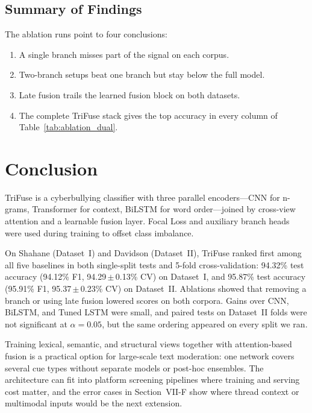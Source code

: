 \subsection{Summary of Findings}

The ablation runs point to four conclusions:
\begin{enumerate}
\item A single branch misses part of the signal on each corpus.
\item Two-branch setups beat one branch but stay below the full model.
\item Late fusion trails the learned fusion block on both datasets.
\item The complete TriFuse stack gives the top accuracy in every column of Table~\ref{tab:ablation_dual}.
\end{enumerate}

\section{Conclusion}

TriFuse is a cyberbullying classifier with three parallel encoders---CNN for n-grams, Transformer for context, BiLSTM for word order---joined by cross-view attention and a learnable fusion layer. Focal Loss and auxiliary branch heads were used during training to offset class imbalance.

On Shahane (Dataset~I) and Davidson (Dataset~II), TriFuse ranked first among all five baselines in both single-split tests and 5-fold cross-validation: 94.32\% test accuracy (94.12\% F1, 94.29\,$\pm$\,0.13\% CV) on Dataset~I, and 95.87\% test accuracy (95.91\% F1, 95.37\,$\pm$\,0.23\% CV) on Dataset~II. Ablations showed that removing a branch or using late fusion lowered scores on both corpora. Gains over CNN, BiLSTM, and Tuned LSTM were small, and paired tests on Dataset~II folds were not significant at $\alpha=0.05$, but the same ordering appeared on every split we ran.

Training lexical, semantic, and structural views together with attention-based fusion is a practical option for large-scale text moderation: one network covers several cue types without separate models or post-hoc ensembles. The architecture can fit into platform screening pipelines where training and serving cost matter, and the error cases in Section~VII-F show where thread context or multimodal inputs would be the next extension.

